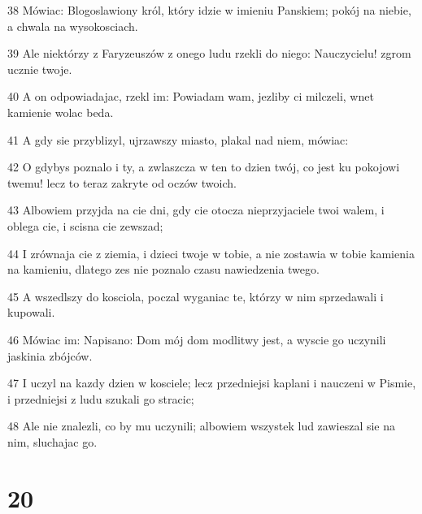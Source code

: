 \par 38 Mówiac: Blogoslawiony król, który idzie w imieniu Panskiem; pokój na niebie, a chwala na wysokosciach.
\par 39 Ale niektórzy z Faryzeuszów z onego ludu rzekli do niego: Nauczycielu! zgrom ucznie twoje.
\par 40 A on odpowiadajac, rzekl im: Powiadam wam, jezliby ci milczeli, wnet kamienie wolac beda.
\par 41 A gdy sie przyblizyl, ujrzawszy miasto, plakal nad niem, mówiac:
\par 42 O gdybys poznalo i ty, a zwlaszcza w ten to dzien twój, co jest ku pokojowi twemu! lecz to teraz zakryte od oczów twoich.
\par 43 Albowiem przyjda na cie dni, gdy cie otocza nieprzyjaciele twoi walem, i oblega cie, i scisna cie zewszad;
\par 44 I zrównaja cie z ziemia, i dzieci twoje w tobie, a nie zostawia w tobie kamienia na kamieniu, dlatego zes nie poznalo czasu nawiedzenia twego.
\par 45 A wszedlszy do kosciola, poczal wyganiac te, którzy w nim sprzedawali i kupowali.
\par 46 Mówiac im: Napisano: Dom mój dom modlitwy jest, a wyscie go uczynili jaskinia zbójców.
\par 47 I uczyl na kazdy dzien w kosciele; lecz przedniejsi kaplani i nauczeni w Pismie, i przedniejsi z ludu szukali go stracic;
\par 48 Ale nie znalezli, co by mu uczynili; albowiem wszystek lud zawieszal sie na nim, sluchajac go.

\chapter{20}

